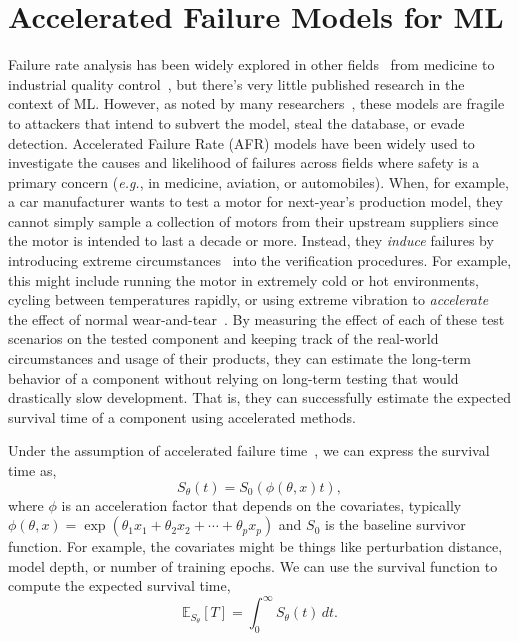 
\section{Accelerated Failure Models for ML}
\label{afr_models}
Failure rate analysis has been widely explored in other fields~\citep{aft_models} from medicine to industrial quality control~\citep{ai_medical_imaging,ai_industry,ai_aviation,ai_luggage,ai_security,ai_prison}, but there's very little published research in the context of ML. However, as noted by many researchers~\citep{madry2017towards, carlini_towards_2017, croce_reliable_2020, meyers}, these models are fragile to attackers that intend to subvert the model, steal the database, or evade detection.  Accelerated Failure Rate (AFR) models have been widely used to investigate the causes and likelihood of failures across fields where safety is a primary concern (\textit{e.g.}, in medicine, aviation, or automobiles). When, for example, a car manufacturer wants to test a motor for next-year's production model, they cannot simply sample a collection of motors from their upstream suppliers since the motor is intended to last a decade or more. Instead, they \textit{induce} failures by introducing extreme circumstances~\citep{liu2013development,lawless1995methods} into the verification procedures. For example, this might include running the motor in extremely cold or hot environments, cycling between temperatures rapidly, or using extreme vibration to \textit{accelerate} the effect of normal wear-and-tear~\citep{meeker1998accelerated}. By measuring the effect of each of these test scenarios on the tested component and keeping track of the real-world circumstances and usage of their products, they can estimate the long-term behavior of a component without relying on long-term testing that would drastically slow development. That is, they can successfully estimate the expected survival time of a component using accelerated methods.

Under the assumption of accelerated failure time~\cite{kleinbaum1996survival}, we can express the survival time as,
$$
	S_\theta(t) = S_0(\phi(\theta, x) t),
$$
where $\phi$ is an acceleration factor that depends on the covariates, typically $\phi(\theta, x) = \exp{(\theta_1 x_1 + \theta_2 x_2 + \cdots + \theta_p x_p)}$ and $S_0$ is the baseline survivor function. For example, the covariates might be things like perturbation distance, model depth, or number of training epochs. We can use the survival function to compute the expected survival time,
\[
	\mathbb{E}_{S_\theta}[T] = \int_0^{\infty}S_\theta(t) \,dt.
\]

